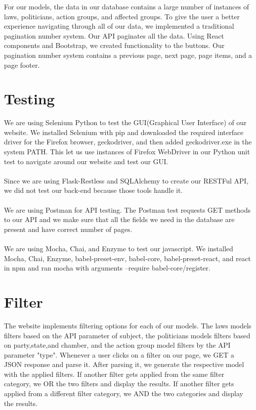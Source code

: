 \documentclass[12pt]{article}
\begin{document}
For our models, the data in our database contains a large number of instances of laws, politicians, action groups, and affected groups. To give the user a better experience navigating through all of our data, we implemented a traditional pagination number system. Our API paginates all the data. Using React components and Bootstrap, we created functionality to the buttons. Our pagination number system contains a previous page, next page, page items, and a page footer.

\section{Testing}

We are using Selenium Python to test the GUI(Graphical User Interface) of our website. We installed Selenium with pip and downloaded the required interface driver for the Firefox browser, geckodriver, and then added geckodriver.exe in the system PATH. This let us use instances of Firefox WebDriver in our Python unit test to navigate around our website and test our GUI.
\\
\\
Since we are using Flask-Restless and SQLAlchemy to create our RESTFul API, we did not test our back-end because those tools handle it.
\\
\\
We are using Postman for API testing. The Postman test requests GET methods to our API and we make sure that all the fields we need in the database are present and have correct number of pages. 
\\
\\
We are using Mocha, Chai, and Enzyme to test our javascript. We installed Mocha, Chai, Enzyme, babel-preset-env, babel-core, babel-preset-react, and react in npm and ran mocha with arguments --require babel-core/register.

\section{Filter}

The website implements filtering options for each of our models. The laws models filters based on the API parameter of subject, the politicians models filters based on party,state,and chamber, and the action group model filters by the API parameter "type". Whenever a user clicks on a filter on our page, we GET a JSON response and parse it. After parsing it, we generate the respective model with the applied filters. If another filter gets applied from the same filter category, we OR the two filters and display the results. If another filter gets applied from a different filter category, we AND the two categories and display the results. 
\end{document}
